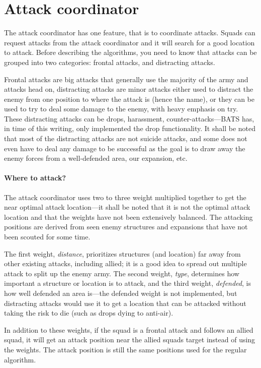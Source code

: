 
\section{Attack coordinator}
\label{sec:attack_coordinator}
The attack coordinator has one feature, that is to coordinate attacks. Squads can request attacks from the attack coordinator and it will search for a good location to attack. Before describing the algorithms, you need to know that attacks can be grouped into two categories: frontal attacks, and distracting attacks.

Frontal attacks are big attacks that generally use the majority of the army and attacks head on, distracting attacks are minor attacks either used to distract the enemy from one position to where the attack is (hence the name), or they can be used to try to deal some damage to the enemy, with heavy emphasis on try. These distracting attacks can be drops, harassment, counter-attacks—BATS has, in time of this writing, only implemented the drop functionality. It shall be noted that most of the distracting attacks are not suicide attacks, and some does not even have to deal any damage to be successful as the goal is to draw away the enemy forces from a well-defended area, our expansion, etc.

\paragraph{Where to attack?}
The attack coordinator uses two to three weight multiplied together to get the near optimal attack location—it shall be noted that it is not the optimal attack location and that the weights have not been extensively balanced. The attacking positions are derived from seen enemy structures and expansions that have not been scouted for some time.

The first weight, \emph{distance}, prioritizes structures (and location) far away from other existing attacks, including allied; it is a good idea to spread out multiple attack to split up the enemy army. The second weight, \emph{type}, determines how important a structure or location is to attack, and the third weight, \emph{defended}, is how well defended an area is—the defended weight is not implemented, but distracting attacks would use it to get a location that can be attacked without taking the risk to die (such as drops dying to anti-air).

In addition to these weights, if the squad is a frontal attack and follows an allied squad, it will get an attack position near the allied squads target instead of using the weights. The attack position is still the same positions used for the regular algorithm.

